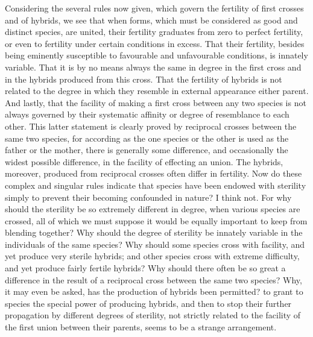 Considering the several rules now given, which govern the fertility of first crosses and of hybrids, we see that when forms, which must be considered as good and distinct species, are united, their fertility graduates from zero to perfect fertility, or even to fertility under certain conditions in excess. That their fertility, besides being eminently susceptible to favourable and unfavourable conditions, is innately variable. That it is by no means always the same in degree in the first cross and in the hybrids produced from this cross. That the fertility of hybrids is not related to the degree in which they resemble in external appearance either parent. And lastly, that the facility of making a first cross between any two species is not always governed by their systematic affinity or degree of resemblance to each other. This latter statement is clearly proved by reciprocal crosses between the same two species, for according as the one species or the other is used as the father or the mother, there is generally some difference, and occasionally the widest possible difference, in the facility of effecting an union. The hybrids, moreover, produced from reciprocal crosses often differ in fertility.
Now do these complex and singular rules indicate that species have been endowed with sterility simply to prevent their becoming confounded in nature? I think not. For why should the sterility be so extremely different in degree, when various species are crossed, all of which we must suppose it would be equally important to keep from blending together? Why should the degree of sterility be innately variable in the individuals of the same species? Why should some species cross with facility, and yet produce very sterile hybrids; and other species cross with extreme difficulty, and yet produce fairly fertile hybrids? Why should there often be so great a difference in the result of a reciprocal cross between the same two species? Why, it may even be asked, has the production of hybrids been permitted? to grant to species the special power of producing hybrids, and then to stop their further propagation by different degrees of sterility, not strictly related to the facility of the first union between their parents, seems to be a strange arrangement.
